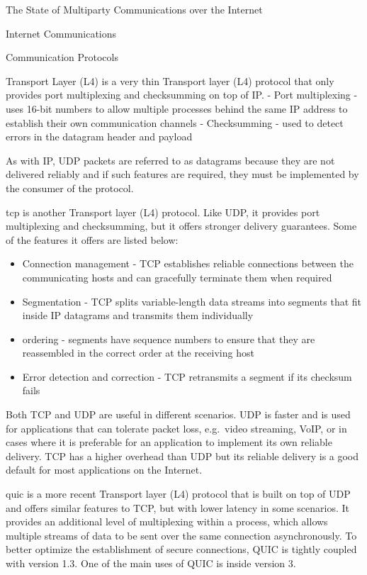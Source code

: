 \begin{frame}[fragile]{The State of Multiparty Communications over the
Internet}
\begin{block}{Internet Communications}
\begin{block}{Communication Protocols}
\begin{block}{Transport Layer (L4)}
\protect\hypertarget{transport-layer-l4}{}
 is a very thin Transport layer (L4) protocol that only provides
port multiplexing and checksumming on top of IP. - Port multiplexing -
uses 16-bit numbers to allow multiple processes behind the same IP
address to establish their own communication channels - Checksumming -
used to detect errors in the datagram header and payload

As with IP, UDP packets are referred to as datagrams because they are
not delivered reliably and if such features are required, they must be
implemented by the consumer of the protocol.

\gls{tcp} is another Transport layer (L4) protocol. Like UDP, it
provides port multiplexing and checksumming, but it offers stronger
delivery guarantees. Some of the features it offers are listed below:

\begin{itemize}
\tightlist
\item
  Connection management - TCP establishes reliable connections between
  the communicating hosts and can gracefully terminate them when
  required
\item
  Segmentation - TCP splits variable-length data streams into segments
  that fit inside IP datagrams and transmits them individually
\item
  ordering - segments have sequence numbers to ensure that they are
  reassembled in the correct order at the receiving host
\item
  Error detection and correction - TCP retransmits a segment if its
  checksum fails
\end{itemize}

Both TCP and UDP are useful in different scenarios. UDP is faster and is
used for applications that can tolerate packet loss, e.g.~video
streaming, VoIP, or in cases where it is preferable for an application
to implement its own reliable delivery. TCP has a higher overhead than
UDP but its reliable delivery is a good default for most applications on
the Internet.

\gls{quic} is a more recent Transport layer (L4) protocol that is built
on top of UDP and offers similar features to TCP, but with lower latency
in some scenarios. It provides an additional level of multiplexing
within a process, which allows multiple streams of data to be sent over
the same connection asynchronously. To better optimize the establishment
of secure connections, QUIC is tightly coupled with  version
1.3. One of the main uses of QUIC is inside  version 3.
\end{block}


\end{block}
\end{block}
\end{frame}
